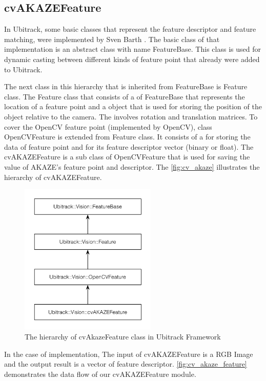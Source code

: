\subsection {cvAKAZEFeature} \label{subsec:cv_akaze_feature}
In Ubitrack, some basic classes that represent the feature descriptor and feature matching, were implemented by Sven Barth \cite{barth2014marker}. The basic class of that implementation is an abstract class with name FeatureBase. This class is used for dynamic casting between different kinds of feature point that already were added to Ubitrack.

The next class in this hierarchy that is inherited from FeatureBase is Feature class. The Feature class that consists of a   of FeatureBase that represents the location of a feature point and a  object that is used for storing the position of the object relative to the camera. The  involves rotation and translation matrices. To cover the OpenCV feature point (implemented by OpenCV), class OpenCVFeature is extended from Feature class. It consists of a  for storing the data of feature point and  for its feature descriptor vector (binary or float). The cvAKAZEFeature is a sub class of OpenCVFeature that is used for saving the value of AKAZE's feature point and descriptor. The \autoref{fig:cv_akaze} illustrates the hierarchy of cvAKAZEFeature.

\begin{figure}[H]
  \centering
  \includegraphics[width=65mm]{figures/cv_akaze}
  \caption{The hierarchy of cvAkazeFeature class in Ubitrack Framework}\label{fig:cv_akaze}
\end{figure}

In the case of implementation, The input of cvAKAZEFeature is a RGB Image and the output result is a vector of feature descriptor. \autoref{fig:cv_akaze_feature} demonstrates the data flow of our cvAKAZEFeature module.

